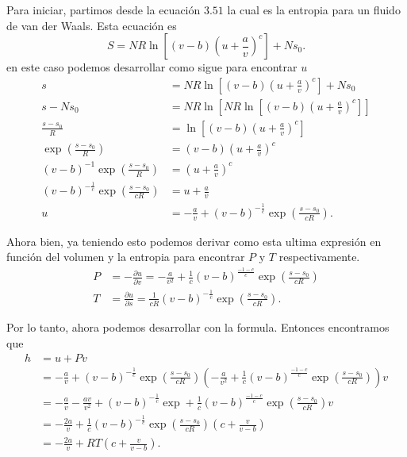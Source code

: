 \documentclass{report}
\begin{document}

Para iniciar, partimos desde la ecuación $3.51$ la cual es la entropia para un fluido de van der Waals. Esta ecuación es \[
  S=NR\ln\left[ \left( v-b \right) \left( u+\frac{a}{v} \right)^c \right] + N s_0
.\] en este caso podemos desarrollar como sigue para encontrar $u$ 
\begin{align*}
  s &= NR\ln\left[ \left( v-b \right) \left( u+\frac{a}{v} \right)^c \right] + N s_0 \\
  s - Ns_0&= NR\ln\left[ NR\ln\left[ \left( v-b \right) \left( u+\frac{a}{v} \right)^c \right]  \right]  \\
  \frac{s-s_0}{R}&= \ln\left[ \left( v-b \right) \left( u+\frac{a}{v} \right)^c \right]  \\
  \exp\left( \frac{s-s_0}{R} \right) &= \left( v-b \right) \left( u+\frac{a}{v} \right)^c \\
  (v-b)^{-1}\exp\left( \frac{s-s_0}{R} \right)&= \left( u+\frac{a}{v} \right)^c \\
  \left( v-b \right)^{-\frac{1}{c}}\exp\left( \frac{s-s_0}{cR} \right)&= u+\frac{a}{v} \\
  u &= -\frac{a}{v}+\left( v-b \right)^{-\frac{1}{c}}\exp\left( \frac{s-s_0}{cR} \right)
.\end{align*}

Ahora bien, ya teniendo esto podemos derivar como esta ultima expresión en función del volumen y la entropia para encontrar $P$ y $T$ respectivamente.
\begin{align*}
  P&= -\frac{\partial u}{\partial v}=-\frac{a}{v^2}+\frac{1}{c}\left( v-b \right)^{\frac{-1-c}{c}}\exp\left( \frac{s-s_0}{cR} \right)  \\
  T&= \frac{\partial u}{\partial s}=\frac{1}{cR}\left( v-b \right)^{-\frac{1}{c}}\exp\left( \frac{s-s_0}{cR} \right)
.\end{align*}

Por lo tanto, ahora podemos desarrollar con la formula. Entonces encontramos que
\begin{align*}
  h&= u +Pv \\
   &=  -\frac{a}{v}+\left( v-b \right)^{-\frac{1}{c}}\exp\left( \frac{s-s_0}{cR} \right)\left(-\frac{a}{v^2}+\frac{1}{c}\left( v-b \right)^{\frac{-1-c}{c}}\exp\left( \frac{s-s_0}{cR} \right)\right)v\\
   &=  -\frac{a}{v}-\frac{av}{v^2}+\left( v-b \right)^{-\frac{1}{c}}\exp+\frac{1}{c}\left( v-b \right)^{\frac{-1-c}{c}}\exp\left( \frac{s-s_0}{cR} \right)v\\
   &= -\frac{2a}{v}+\frac{1}{c}\left( v-b \right)^{-\frac{1}{c}}\exp\left( \frac{s-s_0}{cR} \right)\left( c+\frac{v}{v-b} \right)  \\
   &= -\frac{2a}{v}+RT\left( c+\frac{v}{v-b} \right)
.\end{align*}
\end{document}

